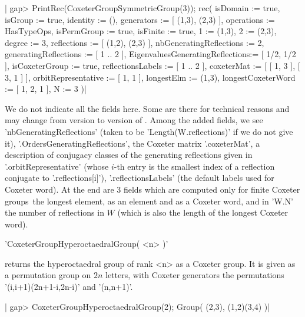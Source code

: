 |    gap> PrintRec(CoxeterGroupSymmetricGroup(3));
    rec(
      isDomain                        := true,
      isGroup                         := true,
      identity                        := (),
      generators                      := [ (1,3), (2,3) ],
      operations                      := HasTypeOps,
      isPermGroup                     := true,
      isFinite                        := true,
      1                               := (1,3),
      2                               := (2,3),
      degree                          := 3,
      reflections                     := [ (1,2), (2,3) ],
      nbGeneratingReflections         := 2,
      generatingReflections           := [ 1 .. 2 ],
      EigenvaluesGeneratingReflections:= [ 1/2, 1/2 ],
      isCoxeterGroup                  := true,
      reflectionsLabels               := [ 1 .. 2 ],
      coxeterMat                      := [ [ 1, 3 ], [ 3, 1 ] ],
      orbitRepresentative             := [ 1, 1 ],
      longestElm                      := (1,3),
      longestCoxeterWord              := [ 1, 2, 1 ],
      N                               := 3 )|

We  do   not  indicate  all  the   fields  here.  Some  are   there  for
technical  reasons   and  may   change  from   version  to   version  of
\CHEVIE.  Among  the  added  fields,  we  see  'nbGeneratingReflections'
(taken  to   be  'Length(W.reflections)'   if  we   do  not   give  it),
'.OrdersGeneratingReflections',  the  Coxeter  matrix  '.coxeterMat',  a
description of conjugacy classes of  the generating reflections given in
'.orbitRepresentative' (whose  $i$-th entry is  the smallest index  of a
reflection  conjugate to  '.reflections[i]'), '.reflectionsLabels'  (the
default labels used for Coxeter word). At the end are 3 fields which are
computed only  for finite Coxeter  groups\:\ the longest element,  as an
element and as a Coxeter word, and in 'W.N' the number of reflections in
$W$ (which is also the length of the longest Coxeter word).


'CoxeterGroupHyperoctaedralGroup( <n> )'

returns the hyperoctaedral group of rank <n> as a Coxeter group. It is
given as a permutation group on $2n$ letters, with Coxeter generators
the permutations '(i,i+1)(2n+1-i,2n-i)' and '(n,n+1)'.

|    gap> CoxeterGroupHyperoctaedralGroup(2);
    Group( (2,3), (1,2)(3,4) )|

